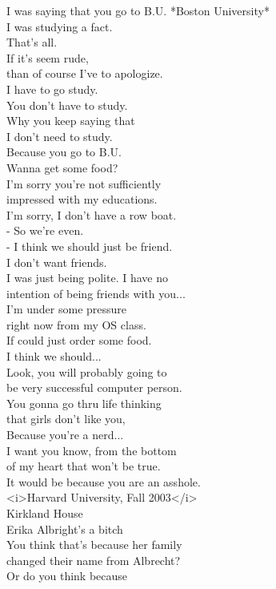 \documentclass{article}
\begin{document}
\begin{multicols}{3}
I was saying that you go to B.U. *Boston University*\\
I was studying a fact.\\
That's all.\\
If it's seem rude,\\
than of course I've to apologize.\\
I have to go study.\\
You don't have to study.\\
Why you keep saying that\\
I don't need to study.\\
Because you go to B.U.\\
Wanna get some food?\\
I'm sorry you're not sufficiently\\
impressed with my educations.\\
I'm sorry, I don't have a row boat.\\
- So we're even.\\
- I think we should just be friend.\\
I don't want friends.\\
I was just being polite. I have no\\
intention of being friends with you...\\
I'm under some pressure\\
right now from my OS class.\\
If could just order some food.\\
I think we should...\\
Look, you will probably going to\\
be very successful computer person.\\
You gonna go thru life thinking\\
that girls don't like you,\\
Because you're a nerd...\\
I want you know, from the bottom\\
of my heart that won't be true.\\
It would be because you are an asshole.\\
<i>Harvard University, Fall 2003</i>\\
Kirkland House\\
Erika Albright's a bitch\\
You think that's because her family\\
changed their name from Albrecht?\\
Or do you think because\\

\end{multicols}
\end{document}
